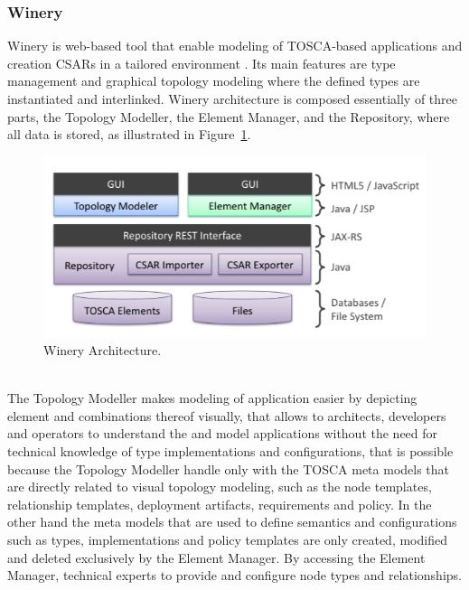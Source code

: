 \subsubsection{Winery}
\label{subs:Winery}
Winery is web-based tool that enable modeling of TOSCA-based applications and creation CSARs in a tailored environment \cite{Winery}. Its main features are type management and graphical topology modeling where the defined types
are instantiated and interlinked. Winery architecture is composed essentially of three parts, the Topology Modeller, the Element Manager, and the Repository, where all data is stored, as illustrated in Figure~\ref{fig:winery}.
\begin{figure}[h!]
  \centering
  \includegraphics[width=\textwidth]{images/winery}
  \caption{Winery Architecture.}
  \label{fig:winery}
\end{figure}\\
The Topology Modeller makes modeling of application easier by depicting element and combinations thereof visually, that allows to architects, developers and operators to understand the and model applications without the need for
technical knowledge of type implementations and configurations, that is possible because the Topology Modeller handle only with the TOSCA meta models that are directly related to visual topology modeling, such as the node templates,
relationship templates, deployment artifacts, requirements and policy. In the other hand the meta models that are used to define semantics and configurations such as types, implementations and policy templates are only created, modified
and deleted exclusively by the Element Manager. By accessing the Element Manager, technical experts to provide and configure node types and relationships.
